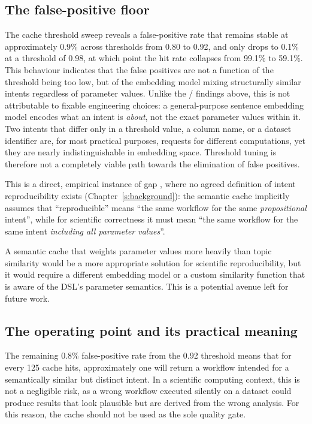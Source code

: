 \subsection{The false-positive floor}

The cache threshold sweep reveals a
false-positive rate that remains stable at approximately 0.9\% across
thresholds from 0.80 to 0.92, and only drops to 0.1\% at a threshold of
0.98, at which point the hit rate collapses from 99.1\% to 59.1\%.
This behaviour indicates that the false positives are not a function of the
threshold being too low, but of the embedding model mixing structurally
similar intents regardless of parameter values. Unlike the /
findings above, this is not attributable to fixable engineering choices: a
general-purpose sentence embedding model encodes what an intent is
\emph{about}, not the exact parameter values within it. Two intents that
differ only in a threshold value, a column name, or a dataset identifier are,
for most practical purposes, requests for different computations, yet they
are nearly indistinguishable in embedding space. Threshold tuning is therefore
not a completely viable path towards the elimination of false positives.

This is a direct, empirical instance of gap , where no agreed definition of intent
reproducibility exists (Chapter~\ref{s:background}): the semantic cache implicitly
assumes that ``reproducible'' means ``the same workflow for the same
\emph{propositional} intent'', while for scientific correctness it must mean
``the same workflow for the same intent \emph{including all parameter values}''.

A semantic cache that weights parameter values more heavily than topic similarity 
would be a more appropriate solution for scientific reproducibility, but it would require a
different embedding model or a custom similarity function that is aware of the DSL's 
parameter semantics. This is a potential avenue left for future work.

\subsection{The operating point and its practical meaning}

The remaining 0.8\% false-positive rate from the 0.92 threshold means that for every 125 cache hits, approximately
one will return a workflow intended for a semantically similar but distinct
intent. In a scientific computing context, this is not a negligible risk, as a
wrong workflow executed silently on a dataset could produce results that look
plausible but are derived from the wrong analysis. For this reason, the cache should
not be used as the sole quality gate.

